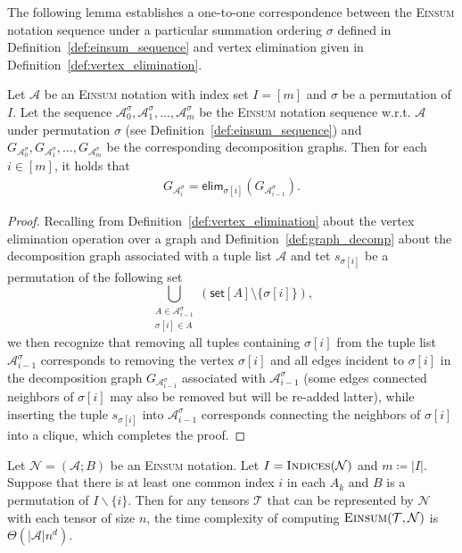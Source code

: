 \documentclass[twoside,11pt]{article}
\newcommand{\Zhang}[1]{{\color{blue}{Zhang: #1}}}
\def\Einsum{\textsc{Einsum}}
\newcommand{\takesetp}[1]{\mathsf{set}[#1]}
\newcommand{\indexset}{\textsc{Indices}}
\newcommand{\tensorcontraction}{\textsc{Einsum}}
\newcommand{\graphform}[1]{G_{#1}}
\newcommand{\appequal}{\Theta}
\newcommand{\eliminatevg}[2]{\mathsf{elim}_{#1}(#2)}
\def\calN{\mathcal{N}}
\def\calA{\mathcal{A}}
\def\calT{\mathcal{T}}
\begin{document}
The following lemma establishes a one-to-one correspondence between the \Einsum{} notation sequence under a particular summation ordering $\sigma$ defined in Definition~\ref{def:einsum_sequence} and vertex elimination given in Definition~\ref{def:vertex_elimination}.

\begin{lemma}
\label{lem:einsum_graph_seq}
Let $\calA$ be an \Einsum{} notation with index set $I = [m]$ and $\sigma$ be a permutation of $I$. Let the sequence $\calA^{\sigma}_0, \calA^{\sigma}_1, \ldots, \calA^{\sigma}_m$ be the \Einsum{} notation sequence w.r.t. $\calA$ under permutation $\sigma$ (see Definition~\ref{def:einsum_sequence}) and $\graphform{\calA^{\sigma}_0}, \graphform{\calA^{\sigma}_1}, \ldots, \graphform{\calA^{\sigma}_m}$ be the corresponding decomposition graphs. Then for each $i \in [m]$, it holds that
\begin{align*}
   \graphform{\calA^{\sigma}_i} = \eliminatevg{\sigma[i]}{\graphform{\calA^{\sigma}_{i-1}}}.
\end{align*}
\end{lemma}

\begin{proof}
Recalling from Definition~\ref{def:vertex_elimination} about the vertex elimination operation over a graph and Definition~\ref{def:graph_decomp} about the decomposition graph associated with a tuple list $\calA$ and tet $s_{\sigma[i]}$ be a permutation of the following set 
\begin{equation*}
    \bigcup_{\substack{ A \in \calA^{\sigma}_{i-1} \\ \sigma[i] \in A}} (\takesetp{A} \setminus \{\sigma[i]\}), 
\end{equation*}
we then recognize that removing all tuples containing $\sigma[i]$ from the tuple list $\calA^{\sigma}_{i - 1}$ corresponds to removing the vertex $\sigma[i]$ and all edges incident to $\sigma[i]$ in the decomposition graph $\graphform{\calA^{\sigma}_{i-1}}$ associated with $\calA^{\sigma}_{i-1}$ (some edges connected neighbors of $\sigma[i]$ may also be removed but will be re-added latter), while inserting the tuple $s_{\sigma[i]}$ into $\calA^{\sigma}_{i-1}$ corresponds connecting the neighbors of $\sigma[i]$ into a clique, which completes the proof. 
\end{proof}

\begin{lemma}
\label{lem:complexity_one_index}
Let $\calN = (\calA; B)$ be an \Einsum{} notation. Let $I = \indexset(\calN)$ and $m \coloneqq |I|$. Suppose that there is at least one common index $i$ in each $A_k$ and $B$ is a permutation of $I \backslash \{i\}$. Then for any tensors $\calT$ that can be represented by $\calN$ with each tensor of size $n$, the time complexity of computing $\tensorcontraction(\calT, \calN)$ is $\appequal(|\calA|n^{d})$.
\end{lemma}
\end{document}
